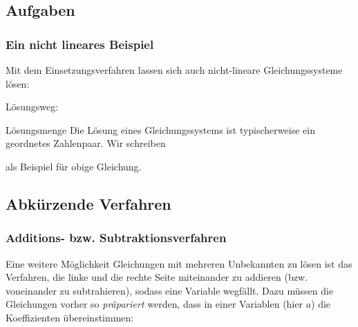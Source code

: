 \subsection*{Aufgaben}

\newpage
  
\subsubsection{Ein nicht lineares Beispiel}
Mit dem Einsetzungsverfahren lassen sich auch nicht-lineare
Gleichungssysteme lösen:

Lösungsweg:

  \begin{gesetz}{Lösungsmenge}{}
    Die Lösung eines Gleichungssystems ist typischerweise ein
    geordnetes Zahlenpaar. Wir schreiben 


  als Beispiel für obige Gleichung.
    
    \end{gesetz}

  \newpage

\subsection{Abkürzende Verfahren}
\subsubsection{Additions- bzw. Subtraktionsverfahren}
Eine weitere Möglichkeit Gleichungen mit mehreren Unbekannten zu lösen ist das Verfahren, die linke und die rechte Seite miteinander zu addieren (bzw. voneinander zu subtrahieren), sodass eine Variable wegfällt. Dazu müssen die Gleichungen vorher so \textit{präpariert} werden, dass in einer Variablen (hier \zB $a$) die Koeffizienten übereinstimmen:

